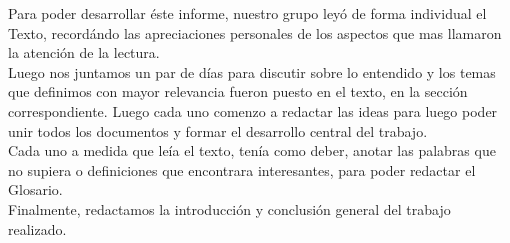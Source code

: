 Para poder desarrollar \'este informe, nuestro grupo ley\'o de forma individual el Texto, record\'ando las apreciaciones
personales de los aspectos que mas llamaron la atenci\'on de la lectura.\\
Luego nos juntamos un par de d\'ias para discutir sobre lo entendido y los temas que definimos con mayor relevancia
fueron puesto en el texto, en la secci\'on correspondiente. Luego cada uno comenzo a redactar las ideas para luego poder
unir todos los documentos y formar el desarrollo central del trabajo.\\
Cada uno a medida que le\'ia el texto, ten\'ia como deber, anotar las palabras que no supiera o definiciones que encontrara
interesantes, para poder redactar el Glosario.\\
Finalmente, redactamos la introducci\'on y conclusi\'on general del trabajo realizado.
